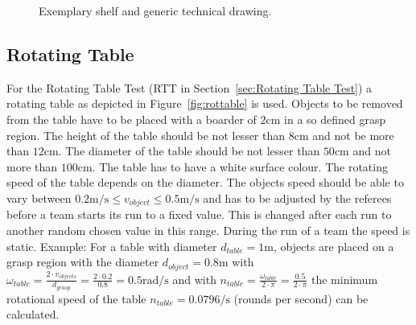 \begin{figure}[h!]
\centering
{}
\hspace{0.5cm}
\caption{Exemplary shelf and generic technical drawing.}%
\label{fig:shelf}
\end{figure}


\subsection{Rotating Table}\label{sec:Rotating Table}
For the Rotating Table Test (RTT in Section~\ref{sec:Rotating Table Test}) a rotating table as depicted in Figure~\ref{fig:rottable} is used. 
Objects to be removed from the table have to be placed with a boarder of $2\si{\centi\meter}$ in a so defined grasp region. The height of the table should be not lesser than $8\si{\centi\meter}$ and not be more than $12\si{\centi\meter}$. The diameter of the table should be not lesser than $50\si{\centi\meter}$ and not more than $100\si{\centi\meter}$. The table has to have a white surface colour. The rotating speed of the table depends on the diameter. The objects speed should be able to vary between $0.2 \si{\meter\per\second} \le v_{object} \le 0.5 \si{\meter\per\second}$ and has to be adjusted by the referees before a team starts its run to a fixed value. This is changed after each run to another random chosen value in this range. During the run of a team the speed is static. Example: For a table with diameter $d_{table}=1\si{\meter}$, objects are placed on a grasp region with the diameter $d_{object}=0.8\si{\meter}$ with $\omega_{table} = \frac{2 \cdot v_{objects} }{d_{grasp}}=\frac{2 \cdot 0.2}{0.8}=0.5\si{\radian\per\second}$ and with $n_{table}=\frac{\omega_{table}}{2 \cdot \pi}=\frac{0.5}{2 \cdot \pi}$ the minimum rotational speed of the table $n_{table}= 0.0796 \si{\per\second}$ (rounds per second) can be calculated.  

